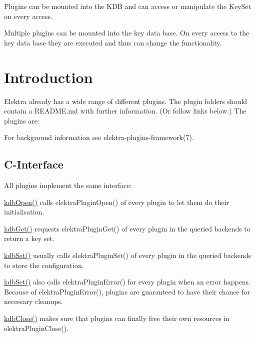 Plugins can be mounted into the K\+D\+B and can access or manipulate the Key\+Set on every access.

Multiple plugins can be mounted into the key data base. On every access to the key data base they are executed and thus can change the functionality.\hypertarget{md_src_plugins_README_src_plugins_README_md}{}\section{Introduction}\label{md_src_plugins_README_src_plugins_README_md}
Elektra already has a wide range of different plugins. The plugin folders should contain a R\+E\+A\+D\+M\+E.\+md with further information. (Or follow links below.) The plugins are\+:

 For background information see elektra-\/plugins-\/framework(7).

\subsection*{C-\/\+Interface}

All plugins implement the same interface\+:


\begin{DoxyItemize}
\item {\ttfamily \hyperlink{group__kdb_ga6808defe5870f328dd17910aacbdc6ca}{kdb\+Open()}} calls {\ttfamily elektra\+Plugin\+Open()} of every plugin to let them do their initialisation.
\item {\ttfamily \hyperlink{group__kdb_ga28e385fd9cb7ccfe0b2f1ed2f62453a1}{kdb\+Get()}} requests {\ttfamily elektra\+Plugin\+Get()} of every plugin in the queried backends to return a key set.
\item {\ttfamily \hyperlink{group__kdb_ga11436b058408f83d303ca5e996832bcf}{kdb\+Set()}} usually calls {\ttfamily elektra\+Plugin\+Set()} of every plugin in the queried backends to store the configuration.
\item {\ttfamily \hyperlink{group__kdb_ga11436b058408f83d303ca5e996832bcf}{kdb\+Set()}} also calls {\ttfamily elektra\+Plugin\+Error()} for every plugin when an error happens. Because of {\ttfamily elektra\+Plugin\+Error()}, plugins are guaranteed to have their chance for necessary cleanups.
\item {\ttfamily \hyperlink{group__kdb_gadb54dc9fda17ee07deb9444df745c96f}{kdb\+Close()}} makes sure that plugins can finally free their own resources in {\ttfamily elektra\+Plugin\+Close()}.
\end{DoxyItemize}

